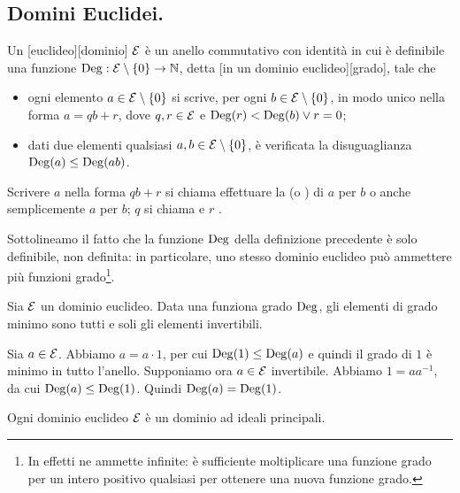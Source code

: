 \subsection{Domini Euclidei.}\label{DominiEuclidei}
\begin{Definition}
	Un [euclideo][dominio] $\mathcal{E}$ \`e un anello commutativo con identit\`a in cui \`e definibile una funzione $\operatorname{Deg}: \mathcal{E} \setminus \lbrace 0 \rbrace \rightarrow \mathbb{N}$, detta [in un dominio euclideo][grado], tale che
	\begin{itemize}
		\item ogni elemento $a \in \mathcal{E} \setminus \lbrace 0 \rbrace$ si scrive, per ogni $b \in \mathcal{E} \setminus \lbrace 0 \rbrace$, in modo unico nella forma $a = qb + r$, dove $q, r \in \mathcal{E}$ e $\operatorname{Deg}(r) < \operatorname{Deg}(b) \vee r = 0$;
		\item dati due elementi qualsiasi $a, b \in \mathcal{E} \setminus \lbrace 0 \rbrace$, \`e verificata la disuguaglianza $\operatorname{Deg}(a) \leq \operatorname{Deg}(ab)$.
	\end{itemize}
	Scrivere $a$ nella forma $qb + r$ si chiama effettuare la  (o ) di $a$ per $b$ o anche semplicemente  $a$ per $b$; $q$ si chiama  e $r$ .
\end{Definition}
\par Sottolineamo il fatto che la funzione $\operatorname{Deg}$ della definizione precedente \`e solo definibile, non definita: in particolare, uno stesso dominio euclideo pu\`o ammettere pi\`u funzioni grado\footnote{In effetti ne ammette infinite: \`e sufficiente moltiplicare una funzione grado per un intero positivo qualsiasi per ottenere una nuova funzione grado.}.
\begin{Theorem}
	Sia $\mathcal{E}$ un dominio euclideo. Data una funziona grado $\operatorname{Deg}$, gli elementi di grado minimo sono tutti e soli gli elementi invertibili.
\end{Theorem}
\Proof Sia $a \in \mathcal{E}$. Abbiamo $a = a \cdot 1$, per cui $\operatorname{Deg}(1) \leq \operatorname{Deg}(a)$ e quindi il grado di $1$ \`e minimo in tutto l'anello.
\Proof Supponiamo ora $a \in \mathcal{E}$ invertibile. Abbiamo $1 = aa^{-1}$, da cui $\operatorname{Deg}(a) \leq \operatorname{Deg}(1)$. Quindi $\operatorname{Deg}(a) = \operatorname{Deg}(1)$. \EndProof
\begin{Theorem}
	Ogni dominio euclideo $\mathcal{E}$ \`e un dominio ad ideali principali.
\end{Theorem}
